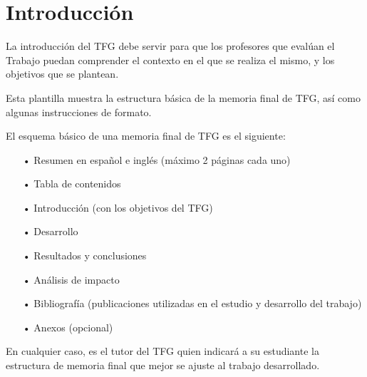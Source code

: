 \chapter{Introducción}
La introducción del TFG debe servir para que los profesores que evalúan el Trabajo puedan comprender el contexto en el que se realiza el mismo, y los objetivos que se plantean.

Esta plantilla muestra la estructura básica de la memoria final de TFG, así como algunas instrucciones de formato.

El esquema básico de una memoria final de TFG es el siguiente:
\begin{itemize}
\item[•] Resumen en español e inglés (máximo 2 páginas cada uno)
\item[•] Tabla de contenidos
\item[•] Introducción (con los objetivos del TFG)
\item[•] Desarrollo
\item[•] Resultados y conclusiones
\item[•] Análisis de impacto
\item[•] Bibliografía (publicaciones utilizadas en el estudio y desarrollo del trabajo)
\item[•] Anexos (opcional)
\end{itemize}

En cualquier caso, es el tutor del TFG quien indicará a su estudiante la estructura de memoria final que mejor se ajuste al trabajo desarrollado.

